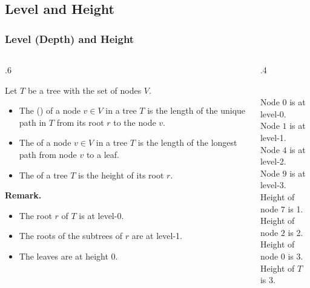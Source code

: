 \documentclass[10pt]{beamer}
\begin{document}
\subsection{Level and Height}
\begin{frame}[t]\frametitle{Level (Depth) and Height}
	\begin{columns}[T] %
	\begin{column}{.6\linewidth} %
	{\footnotesize 
		\begin{definition}
			Let $T$  be a tree with the set of nodes $V$.
			\begin{itemize}
				\item
				The  () of a node $v \in V$
				in a tree $T$ is the length of the unique path in $T$
				from its root $r$ to the node $v$.
		
				\item
				The  of a node $v\in V$ in a tree $T$
				is the length of the longest path from node $v$ to a leaf.
			
				\item
				The  of a tree $T$ is the height of its root $r$.
			\end{itemize}
		\end{definition}	

		\textbf{Remark.}
		\begin{itemize}
			
			\item 
			The root $r$ of $T$ is at level-0.
			
			\item
			The roots of the subtrees of $r$ are at level-1.
			
			\item
			The leaves are at height 0.
		
		\end{itemize}
	} %
	\end{column} %
	\begin{column}{.4\linewidth} %
		\begin{example}
		{\scriptsize
			
			\\
			Node $0$ is at level-0.\\
			Node $1$ is at level-1.\\
			Node $4$ is at level-2.\\
			Node $9$ is at level-3.\\
			Height of node $7$ is 1.\\
			Height of node $2$ is 2.\\
			Height of node $0$ is 3.\\
			Height of  $T$ is 3.\\
		} %
		\end{example}
	\end{column} %
	\end{columns} %
\end{frame}
\end{document}
